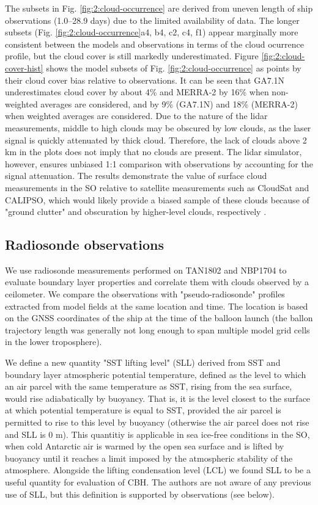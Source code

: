 The subsets in Fig. \ref{fig:2:cloud-occurrence} are derived from uneven
length of ship observations (1.0--28.9 days) due to the limited availability of data.
The longer subsets (Fig. \ref{fig:2:cloud-occurrence}a4, b4, c2, c4, f1)
appear marginally more consistent between the models and observations
in terms of the cloud ocurrence profile, but the cloud cover is still markedly
underestimated.
Figure \ref{fig:2:cloud-cover-hist} shows the model subsets of Fig.
\ref{fig:2:cloud-occurrence} as points by their cloud cover bias relative to
observations. It can be seen that GA7.1N underestimates cloud cover by about
4\% and MERRA-2 by 16\% when non-weighted averages are considered, and by 9\%
(GA7.1N) and 18\% (MERRA-2) when weighted averages are considered.
Due to the nature of the lidar measurements, middle to high clouds may be
obscured by low clouds, as the laser signal is quickly attenuated by thick
cloud. Therefore, the lack of clouds above 2 \unit{km} in the plots does not
imply that no clouds are present. The lidar simulator, however, ensures
unbiased 1:1 comparison with observations by accounting for the signal
attenuation.
The results demonstrate the value of surface cloud measurements in the SO
relative to satellite measurements such as CloudSat and CALIPSO, which would
likely provide a biased sample of these clouds because of "ground clutter"
and obscuration by higher-level clouds, respectively \citep{alexander2018}.

\subsection{Radiosonde observations}
\label{sec:2:radiosonde-observations}

We use radiosonde measurements performed on TAN1802 and NBP1704 to
evaluate boundary layer properties and correlate them with clouds observed by
a ceilometer. We compare the observations with "pseudo-radiosonde" profiles
extracted from model fields at the same location and time. The location is
based on the GNSS coordinates of the ship at the time of the balloon launch
(the ballon trajectory length was generally not long enough to span multiple
model grid cells in the lower troposphere).

We define a new quantity "SST lifting level" (SLL) derived
from SST and boundary layer atmospheric potential temperature,
defined as the level to which
an air parcel with the same temperature as SST, rising from the sea surface,
would rise adiabatically by buoyancy. That is, it is the level closest to the
surface at which potential temperature is equal to SST, provided the air parcel
is permitted to rise to this level by buoyancy (otherwise the air parcel does
not rise and SLL is 0 m). This quantitiy is applicable in sea ice-free
conditions in the SO, when cold Antarctic air is warmed by the open sea surface
and is lifted by buoyancy until it reaches a limit imposed by the atmospheric
stability of the atmosphere. Alongside the lifting condensation level (LCL) we
found SLL to be a useful quantity for evaluation of CBH. The
authors are not aware of any previous use of SLL, but this definition is
supported by observations (see below).

